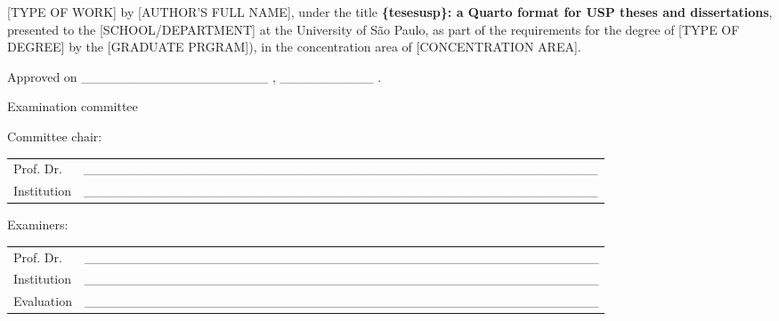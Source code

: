 \documentclass[
  12pt,
  a4paper,
  oneside]{tesesusp}
\begin{document}

\begin{folhadeaprovacao}
  \noindent
{[}TYPE OF WORK{]} by {[}AUTHOR'S FULL NAME{]}, under the title
\textbf{\{tesesusp\}: a Quarto format for USP theses and dissertations},
presented to the {[}SCHOOL/DEPARTMENT{]} at the University of São Paulo,
as part of the requirements for the degree of {[}TYPE OF DEGREE{]} by
the {[}GRADUATE PRGRAM{]}), in the concentration area of
{[}CONCENTRATION AREA{]}.

  \vspace*{1.5cm}

  \noindent
  Approved on \_\_\_\_\_\_\_\_\_\_\_\_\_\_\_\_\_\_\_\_ , \_\_\_\_\_\_\_\_\_\_ .

  \vspace*{1.5cm}

  \begin{center}
    \noindent Examination committee
  \end{center}

  \vspace*{0.5cm}

  \noindent Committee chair:

  \vspace*{0.25cm}

  \renewcommand{\arraystretch}{2}
  \setlength{\arrayrulewidth}{0pt}
  \setlength{\tabcolsep}{0pt}
  \noindent
  \begin{tabular}{m{2cm} P{14cm}}
    Prof. Dr. & \_\_\_\_\_\_\_\_\_\_\_\_\_\_\_\_\_\_\_\_\_\_\_\_\_\_\_\_\_\_\_\_\_\_\_\_\_\_\_\_\_\_\_\_\_\_\_\_\_\_\_\_\_\_\_ \\
    Institution & \_\_\_\_\_\_\_\_\_\_\_\_\_\_\_\_\_\_\_\_\_\_\_\_\_\_\_\_\_\_\_\_\_\_\_\_\_\_\_\_\_\_\_\_\_\_\_\_\_\_\_\_\_\_\_ \\
  \end{tabular}

  \vspace*{1cm}

  \noindent Examiners:

  \vspace*{0.25cm}

  \noindent
  \begin{tabular}{m{2cm} P{14cm}}
    Prof. Dr. & \_\_\_\_\_\_\_\_\_\_\_\_\_\_\_\_\_\_\_\_\_\_\_\_\_\_\_\_\_\_\_\_\_\_\_\_\_\_\_\_\_\_\_\_\_\_\_\_\_\_\_\_\_\_\_ \\
    Institution & \_\_\_\_\_\_\_\_\_\_\_\_\_\_\_\_\_\_\_\_\_\_\_\_\_\_\_\_\_\_\_\_\_\_\_\_\_\_\_\_\_\_\_\_\_\_\_\_\_\_\_\_\_\_\_ \\
    Evaluation & \_\_\_\_\_\_\_\_\_\_\_\_\_\_\_\_\_\_\_\_\_\_\_\_\_\_\_\_\_\_\_\_\_\_\_\_\_\_\_\_\_\_\_\_\_\_\_\_\_\_\_\_\_\_\_ \\
  \end{tabular}


\end{folhadeaprovacao}
\end{document}
